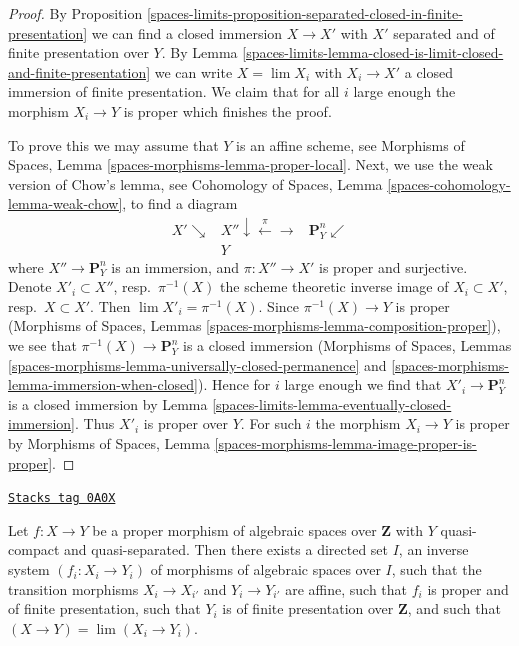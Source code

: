 \begin{proof}
By Proposition \ref{spaces-limits-proposition-separated-closed-in-finite-presentation}
we can find a closed immersion $X \to X'$ with $X'$ separated and of
finite presentation over $Y$. By
Lemma \ref{spaces-limits-lemma-closed-is-limit-closed-and-finite-presentation}
we can write $X = \lim X_i$ with $X_i \to X'$ a closed immersion of
finite presentation. We claim that for all $i$ large enough
the morphism $X_i \to Y$ is proper which finishes the proof.

\medskip\noindent
To prove this we may assume that $Y$ is an affine scheme, see
Morphisms of Spaces, Lemma \ref{spaces-morphisms-lemma-proper-local}.
Next, we use the weak version of Chow's lemma, see
Cohomology of Spaces, Lemma \ref{spaces-cohomology-lemma-weak-chow},
to find a diagram
$$
\begin{array}{ccc}X' \searrow & X'' \downarrow\overset{\pi}{\longleftarrow}\longrightarrow & \mathbf{P}^n_Y \swarrow \\  & Y & \end{array}
$$
where $X'' \to \mathbf{P}^n_Y$ is an immersion, and
$\pi : X'' \to X'$ is proper and surjective. Denote
$X'_i \subset X''$, resp.\ $\pi^{-1}(X)$ the scheme theoretic inverse image of
$X_i \subset X'$, resp.\ $X \subset X'$.
Then $\lim X'_i = \pi^{-1}(X)$. Since $\pi^{-1}(X) \to Y$ is proper
(Morphisms of Spaces, Lemmas \ref{spaces-morphisms-lemma-composition-proper}),
we see that $\pi^{-1}(X) \to \mathbf{P}^n_Y$ is a closed immersion
(Morphisms of Spaces, Lemmas
\ref{spaces-morphisms-lemma-universally-closed-permanence} and
\ref{spaces-morphisms-lemma-immersion-when-closed}).
Hence for $i$ large enough
we find that $X'_i \to \mathbf{P}^n_Y$ is a closed immersion by
Lemma \ref{spaces-limits-lemma-eventually-closed-immersion}.
Thus $X'_i$ is proper over $Y$.
For such $i$ the morphism $X_i \to Y$ is proper by
Morphisms of Spaces, Lemma \ref{spaces-morphisms-lemma-image-proper-is-proper}.
\end{proof}

\begin{lemma}
\label{spaces-limits-lemma-proper-limit-of-proper-finite-presentation-noetherian}
\href{https://stacks.math.columbia.edu/tag/0A0X}{\texttt{Stacks tag 0A0X}}

Let $f : X \to Y$ be a proper morphism of algebraic spaces over $\mathbf{Z}$
with $Y$ quasi-compact and quasi-separated. Then there exists a directed
set $I$, an inverse system $(f_i : X_i \to Y_i)$ of morphisms of algebraic
spaces over $I$, such that the transition morphisms $X_i \to X_{i'}$
and $Y_i \to Y_{i'}$ are affine, such that $f_i$ is proper and of
finite presentation, such that $Y_i$ is of finite presentation over
$\mathbf{Z}$, and such that $(X \to Y) = \lim (X_i \to Y_i)$.
\end{lemma}

